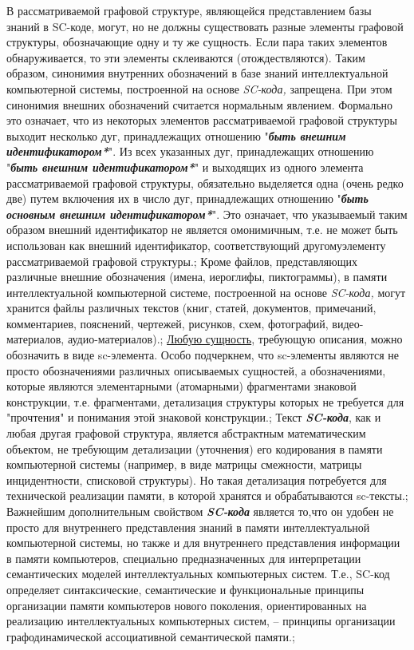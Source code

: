 \begin{SCn}
{В рассматриваемой графовой структуре, являющейся представлением базы знаний в SC-коде, могут, но не должны существовать разные элементы графовой структуры, обозначающие одну и ту же сущность. Если пара таких элементов обнаруживается, то эти элементы склеиваются (отождествляются). Таким образом, синонимия внутренних обозначений в базе знаний интеллектуальной компьютерной системы, построенной на основе \textit{SC-кода,} запрещена. При этом синонимия внешних обозначений считается нормальным явлением. Формально это означает, что из некоторых элементов рассматриваемой графовой структуры выходит несколько дуг, принадлежащих отношению "\textit{\textbf{быть внешним идентификатором*}}". Из всех указанных дуг, принадлежащих отношению "\textit{\textbf{быть внешним идентификатором*}}" и выходящих из одного элемента рассматриваемой графовой структуры, обязательно выделяется одна (очень редко две) путем включения их в число дуг, принадлежащих отношению "\textit{\textbf{быть основным внешним идентификатором*}}". Это означает, что указываемый таким образом внешний идентификатор не является омонимичным, т.е. не может быть использован как внешний идентификатор, соответствующий другомуэлементу рассматриваемой графовой структуры.;
Кроме файлов, представляющих различные внешние обозначения (имена, иероглифы, пиктограммы), в памяти интеллектуальной компьютерной системе, построенной на основе \textit{SC-кода,} могут хранится файлы различных текстов (книг, статей, документов, примечаний, комментариев, пояснений, чертежей, рисунков, схем, фотографий, видео-материалов, аудио-материалов).;
\uline{Любую сущность}, требующую описания, можно обозначить в виде sc-элемента. Особо подчеркнем, что sc-элементы являются не просто обозначениями различных описываемых сущностей, а обозначениями, которые являются элементарными (атомарными) фрагментами знаковой конструкции, т.е. фрагментами, детализация структуры которых не требуется для "прочтения" и понимания этой знаковой конструкции.;
Текст \textit{\textbf{SC-кода}}, как и любая другая графовой структура, является абстрактным математическим объектом, не требующим детализации (уточнения) его кодирования в памяти компьютерной системы (например, в виде матрицы смежности, матрицы инцидентности, списковой структуры). Но такая детализация потребуется для технической реализации памяти, в которой хранятся и обрабатываются sc-тексты.;
Важнейшим дополнительным свойством \textit{\textbf{SC-кода}} является то,что он удобен не просто для внутреннего представления знаний в памяти интеллектуальной компьютерной системы, но также и для внутреннего представления информации в памяти компьютеров, специально предназначенных для интерпретации семантических моделей интеллектуальных компьютерных систем. Т.е., SC-код определяет синтаксические, семантические и функциональные принципы организации памяти компьютеров нового поколения, ориентированных на реализацию интеллектуальных компьютерных систем, -- принципы организации графодинамической ассоциативной семантической памяти.;
}
\end{SCn}
